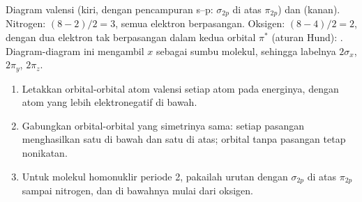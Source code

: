 \begin{omfigure}
\begin{MOdiagram}[names, labels, style=square, distance=4.2cm, labels-fs=\scriptsize]
\end{MOdiagram}
\hfill
\begin{MOdiagram}[names, labels, style=square, distance=4.2cm, labels-fs=\scriptsize]
\end{MOdiagram}

{\small Diagram  valensi  (kiri, dengan pencampuran
s--p: $\sigma_{2p}$ di atas $\pi_{2p}$) dan  (kanan). Nitrogen:  $(8 - 2)/2 = 3$, semua elektron berpasangan. Oksigen: 
$(8 - 4)/2 = 2$, dengan dua elektron tak berpasangan dalam kedua orbital
$\pi^*$ (aturan Hund):  . Diagram-diagram ini mengambil
$x$ sebagai sumbu molekul, sehingga labelnya $2\sigma_x$, $2\pi_y$,
$2\pi_z$.}
\end{omfigure}

\begin{method}\label{met:b2:diatomic-mos:build-diagram}
\begin{enumerate}
  \item Letakkan orbital-orbital atom valensi setiap atom pada energinya,
        dengan atom yang lebih elektronegatif di bawah.
  \item Gabungkan orbital-orbital yang simetrinya sama: setiap pasangan
        menghasilkan satu  di bawah dan satu  di atas; orbital tanpa pasangan tetap nonikatan.
  \item Untuk molekul homonuklir periode 2, pakailah urutan dengan
        $\sigma_{2p}$ di atas $\pi_{2p}$ sampai nitrogen, dan di bawahnya
        mulai dari oksigen.
\end{enumerate}
\end{method}

